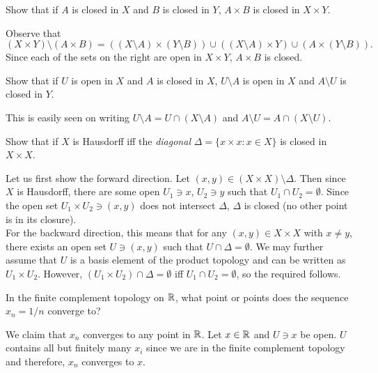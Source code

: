 	\begin{exercise}
		Show that if $A$ is closed in $X$ and $B$ is closed in $Y$, $A\times B$ is closed in $X\times Y$.
	\end{exercise}
	\begin{solution*}
		Observe that
		\[ (X\times Y) \setminus (A\times B) = ((X\setminus A)\times (Y\setminus B)) \cup ((X\setminus A)\times Y) \cup (A\times (Y\setminus B)). \]
		Since each of the sets on the right are open in $X\times Y$, $A\times B$ is closed.
	\end{solution*}

	\begin{exercise}
		Show that if $U$ is open in $X$ and $A$ is closed in $X$, $U\setminus A$ is open in $X$ and $A\setminus U$ is closed in $Y$.
	\end{exercise}
	\begin{solution*}
		This is easily seen on writing $U\setminus A = U \cap (X\setminus A)$ and $A\setminus U = A \cap (X\setminus U)$.
	\end{solution*}

	\setcounter{exercise}{12}
	\begin{exercise}
		Show that if $X$ is Hausdorff iff the \textit{diagonal} $\Delta=\{x\times x : x\in X\}$ is closed in $X\times X$.
	\end{exercise}
	\begin{solution*}
		Let us first show the forward direction. Let $(x,y)\in (X\times X)\setminus \Delta$. Then since $X$ is Hausdorff, there are some open $U_1\ni x$, $U_2\ni y$ such that $U_1\cap U_2 = \emptyset$. Since the open set $U_1\times U_2 \ni (x,y)$ does not intersect $\Delta$, $\Delta$ is closed (no other point is in its closure).\\
		For the backward direction, this means that for any $(x,y)\in X\times X$ with $x\neq y$, there exists an open set $U\ni (x,y)$ such that $U\cap\Delta=\emptyset$. We may further assume that $U$ is a basis element of the product topology and can be written as $U_1\times U_2$. However, $(U_1\times U_2)\cap\Delta=\emptyset$ iff $U_1\cap U_2 = \emptyset$, so the required follows. 
	\end{solution*}

	\begin{exercise}
		In the finite complement topology on $\mathbb{R}$, what point or points does the sequence $x_n=1/n$ converge to?
	\end{exercise}
	\begin{solution*}
		We claim that $x_n$ converges to any point in $\mathbb{R}$. Let $x\in\mathbb{R}$ and $U\ni x$ be open. $U$ contains all but finitely many $x_i$ since we are in the finite complement topology and therefore, $x_n$ converges to $x$.
	\end{solution*}

